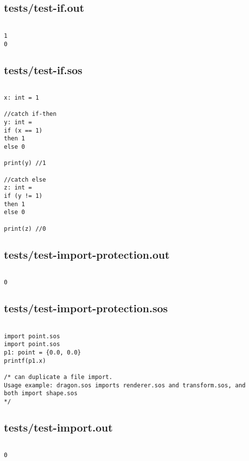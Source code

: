 \documentclass[main.tex]{subfiles}
\begin{document}
\subsection{tests/test-if.out}

\begin{lstlisting}

1
0
\end{lstlisting}

\subsection{tests/test-if.sos}

\begin{lstlisting}

x: int = 1

//catch if-then
y: int = 
if (x == 1)
then 1
else 0

print(y) //1

//catch else
z: int = 
if (y != 1)
then 1
else 0

print(z) //0

\end{lstlisting}

\subsection{tests/test-import-protection.out}

\begin{lstlisting}

0
\end{lstlisting}

\subsection{tests/test-import-protection.sos}

\begin{lstlisting}

import point.sos
import point.sos 
p1: point = {0.0, 0.0} 
printf(p1.x)

/* can duplicate a file import.
Usage example: dragon.sos imports renderer.sos and transform.sos, and both import shape.sos
*/
\end{lstlisting}

\subsection{tests/test-import.out}

\begin{lstlisting}

0
\end{lstlisting}
\end{document}
